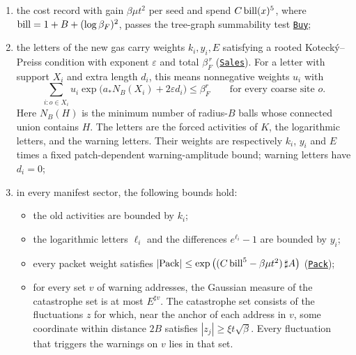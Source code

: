 \documentclass[
  letterpaper,
  11pt]{article}
\providecommand{\tightlist}{%
  \setlength{\itemsep}{0pt}\setlength{\parskip}{0pt}}
\begin{document}
\begin{itemize}
  \begin{enumerate}
  \def\labelenumi{\arabic{enumi}.}
  \tightlist
  \item
    the cost record with gain \(\beta\mu t^2\) per seed and spend
    \(C\,{\rm bill}(x)^5\), where \({\rm bill}=1+B+(\log\beta_F)^2\),
    passes the tree-graph summability test
    \href{https://github.com/yang-mills-group/OpenAI-YM-20261028/blob/3456e5e75cf8d4cd558955a5c7638fba2d68f464/YM/Push/ABSOLUTE_SUMS/Mixed.lean\#L47-L58}{\texttt{Buy}};
  \item
    the letters of the new gas carry weights \(k_i,y_i,E\) satisfying a
    rooted Kotecký--Preiss condition with exponent \(\varepsilon\) and
    total \(\beta_F^{\,r}\)
    (\href{https://github.com/yang-mills-group/OpenAI-YM-20261028/blob/3456e5e75cf8d4cd558955a5c7638fba2d68f464/YM/AnalyticNext/CONNECTED_ACTIVITY_JETS_E6/Weights.lean\#L27-L29}{\texttt{Sales}}).
    For a letter with support \(X_i\) and extra length \(d_i\), this
    means nonnegative weights \(u_i\) with
    \[\sum_{i:o\in X_i}u_i\exp\big(a_*N_B(X_i)+2\varepsilon d_i\big)\le\beta_F^r\qquad\text{for every coarse site }o.\]
    Here \(N_B(H)\) is the minimum number of radius-\(B\) balls whose
    connected union contains \(H\). The letters are the forced
    activities of \(K\), the logarithmic letters, and the warning
    letters. Their weights are respectively \(k_i\), \(y_i\) and \(E\)
    times a fixed patch-dependent warning-amplitude bound; warning
    letters have \(d_i=0\);
  \item
    in every manifest sector, the following bounds hold:

    \begin{itemize}
    \tightlist
    \item
      the old activities are bounded by \(k_i\);
    \item
      the logarithmic letters \(\ell_i\) and the differences
      \(e^{\ell_i}-1\) are bounded by \(y_i\);
    \item
      every packet weight satisfies
      \(|{\rm Pack}|\le\exp\big((C\,{\rm bill}^5-\beta\mu t^2)\,\sharp A\big)\)
      (\href{https://github.com/yang-mills-group/OpenAI-YM-20261028/blob/3456e5e75cf8d4cd558955a5c7638fba2d68f464/YM/AnalyticNext/CONNECTED_ACTIVITY_JETS_E6/Revenue.lean\#L23-L24}{\texttt{Pack}});
    \item
      for every set \(v\) of warning addresses, the Gaussian measure of
      the catastrophe set is at most \(E^{\sharp v}\). The catastrophe
      set consists of the fluctuations \(z\) for which, near the anchor
      of each address in \(v\), some coordinate within distance \(2B\)
      satisfies \(|z_j|\ge\xi t\sqrt\beta\). Every fluctuation that
      triggers the warnings on \(v\) lies in that set.
    \end{itemize}
  \end{enumerate}
\end{itemize}
\end{document}
